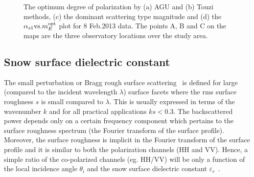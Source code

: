\begin{figure}[!h]
	\caption[The optimum degree of polarization by (a) AGU (b) Touzi methods, (c) the dominant scattering type magnitude and (d) the $\alpha_{s1} \mbox{vs.} m_{E}^{\mbox{\scriptsize opt}}$ plot for 8 Feb.2013 data]{The optimum degree of polarization by (a) AGU and (b) Touzi methods, (c) the dominant scattering type magnitude and (d) the $\alpha_{s1} \mbox{vs.} m_{E}^{\mbox{\scriptsize opt}}$ plot for 8 Feb.2013 data. The points A, B and C on the maps are the three observatory locations over the study area.}
	\label{fig:results_1}
\end{figure}

\subsection{Snow surface dielectric constant}
The small perturbation or Bragg rough surface scattering~\citep{tsang1985theory} is defined for large (compared to the incident wavelength $\lambda$) surface facets where the rms surface roughness $s$ is small compared to $\lambda$. This is usually expressed in terms of the wavenumber $k$ and for all practical applications $ks < 0.3$. The backscattered power depends only on a certain frequency component which pertains to the surface roughness spectrum (the Fourier transform of the surface profile). Moreover, the surface roughness is implicit in the Fourier transform of the surface profile and it is similar to both the polarization channels (HH and VV). Hence, a simple ratio of the co-polarized channels (eg. HH/VV) will be only a function of the local incidence angle $\theta_{i}$ and the snow surface dielectric constant $\varepsilon_{r}$~\citep{cloude2009polarisation}. 

